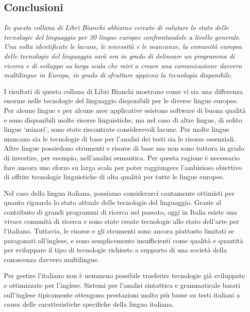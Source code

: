 \begin{multicols}{2}
\subsection{Conclusioni}

\emph{In questa collana di Libri Bianchi abbiamo cercato di valutare lo stato delle tecnologie del linguaggio per 30 lingue europee
  confrontandole a livello generale. Una volta identificate le lacune, le
  necessit\`{a} e le mancanze, la comunit\`{a} europea delle tecnologie del
  linguaggio sar\`{a} ora in grado di delineare un
  programma di ricerca e di sviluppo su larga scala che miri a creare una
  comunicazione davvero multilingue in Europa, in grado di 
 sfruttare appieno la tecnologia disponibile.}

I risultati di questa collana di Libri Bianchi mostrano come vi sia una differenza enorme nelle tecnologie del  linguaggio disponibili per le diverse lingue europee. Per alcune lingue e per alcune aree applicative esistono software di buona qualit\`{a} e sono disponibili molte risorse linguistiche, ma nel caso di altre lingue, di solito lingue `minori', sono state riscontrate considerevoli lacune. Per molte lingue mancano sia le tecnologie di base per l'analisi dei testi sia le risorse essenziali. Altre lingue possiedono strumenti e risorse di base ma non sono tuttora in grado di investire, per esempio, nell'analisi semantica. Per questa ragione \`{e} necessario fare ancora uno sforzo su larga scala per poter raggiungere l'ambizioso obiettivo di offrire tecnologie linguistiche di alta qualit\`{a} per tutte le lingue europee.

Nel caso della lingua italiana, possiamo considerarci cautamente ottimisti per
quanto riguarda lo stato attuale delle tecnologie del linguaggio. Grazie al
contributo di grandi programmi di ricerca nel passato, oggi in Italia esiste
una vivace comunit\`{a} di ricerca e sono state create tecnologie allo stato
dell'arte per l'italiano. Tuttavia, le risorse e gli strumenti sono ancora
piuttosto limitati se paragonati all'inglese, e sono semplicemente
insufficienti come qualit\`{a} e quantit\`{a} per sviluppare il tipo di
tecnologie richieste a supporto di una societ\`{a} della conoscenza davvero
multilingue.

Per gestire l'italiano non \`{e} nemmeno possibile trasferire tecnologie
gi\`{a} sviluppate e ottimizzate per l'inglese. Sistemi per l'analisi
sintattica e grammaticale basati sull'inglese tipicamente ottengono
prestazioni molto pi\`{u} basse su testi italiani a causa delle
caratteristiche specifiche della lingua italiana.


\end{multicols}
